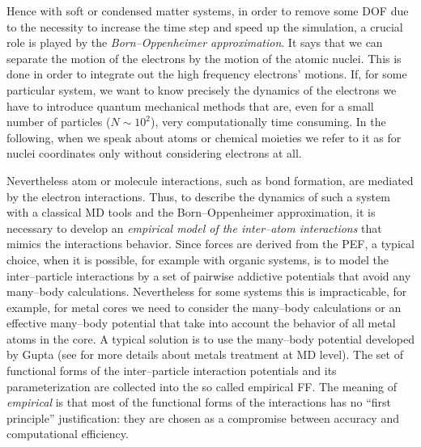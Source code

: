 Hence with soft or condensed matter systems, in order to remove some \ac{DOF} due to the necessity to increase
the time step and speed up the simulation, a crucial role is played by the \textit{Born--Oppenheimer
approximation}. It says that we can separate the motion of the electrons by the motion of the atomic nuclei. This
is done in order to integrate out the high frequency electrons' motions. If, for some particular system, we want
to know precisely the dynamics of the electrons we have to introduce quantum mechanical methods that are, even
for a small number of particles ($N\sim 10^2$), very computationally time consuming. In the following, when we
speak about atoms or chemical moieties we refer to it as for nuclei coordinates only without considering
electrons at all.

Nevertheless atom or molecule interactions, such as bond formation, are mediated by the electron interactions.
Thus, to describe the dynamics of such a system with a classical \ac{MD} tools and the Born--Oppenheimer
approximation, it is necessary to develop an \textit{empirical model of the inter--atom interactions} that mimics
the interactions behavior. Since forces are derived from the \ac{PEF}, a typical choice, when it is possible, for
example with organic systems, is to model the inter--particle interactions by a set of pairwise addictive
potentials that avoid any many--body calculations. Nevertheless for some systems this is impracticable, for
example, for metal cores we need to consider the many--body calculations or an effective many--body potential
that take into account the behavior of all metal atoms in the core. A typical solution is to use the many--body
potential developed by Gupta (see \cite{Leach} for more details about metals treatment at \ac{MD} level). The set
of functional forms of the inter--particle interaction potentials and its parameterization are collected into the
so called empirical \acf{FF}. The meaning of \textit{empirical} is that most of the functional forms of the
interactions has no ``first principle'' justification: they are chosen as a compromise between accuracy and
computational efficiency.


